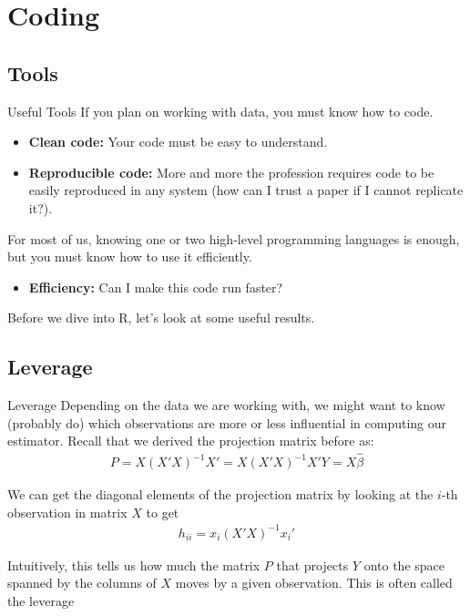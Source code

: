 \section{Coding}

\subsection{Tools}

\begin{frame}{Useful Tools}
    If you plan on working with data, you must know how to code.
    \begin{itemize}
        \item \textbf{Clean code:} Your code must be easy to understand.
        \item \textbf{Reproducible code:} More and more the profession requires code to be easily reproduced in any system (how can I trust a paper if I cannot replicate it?).
    \end{itemize}

    \vspace{2em}
    
    For most of us, knowing one or two high-level programming languages is enough, but you must know how to use it efficiently.
    \begin{itemize}
        \item \textbf{Efficiency:} Can I make this code run faster?
    \end{itemize}

    Before we dive into R, let's look at some useful results.
    
\end{frame}

\subsection{Leverage}

\begin{frame}{Leverage}
    Depending on the data we are working with, we might want to know (probably do) which observations are more or less influential in computing our estimator. Recall that we derived the projection matrix before as:
    \begin{align*}
        P = X(X'X)^{-1}X' =  X(X'X)^{-1}X'Y = X \hat{\beta}
    \end{align*}
    
    We can get the diagonal elements of the projection matrix by looking at the $i$-th observation in matrix $X$ to get
    \begin{align*}
        h_{ii} = x_i (X' X)^{-1} x_i'
    \end{align*}

    Intuitively, this tells us how much the matrix $P$ that projects $Y$ onto the space spanned by the columns of $X$ moves by a given observation. This is often called the leverage

\end{frame}

